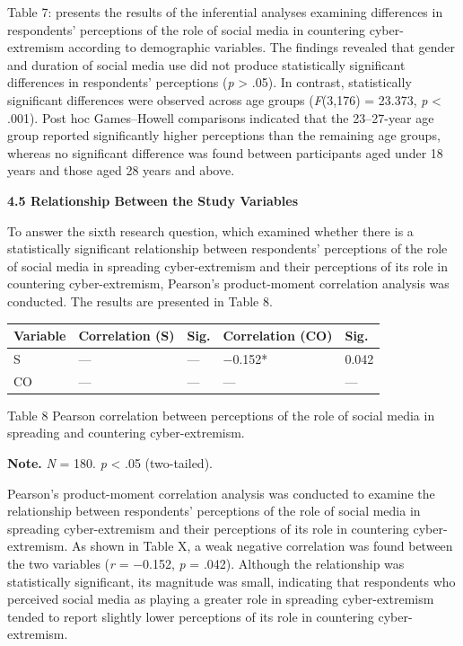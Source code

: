 \documentclass[11pt,a4paper]{article}
\begin{document}
	Table 7: presents the results of the inferential analyses examining differences in respondents' perceptions of the role of social media in countering cyber-extremism according to demographic variables. The findings revealed that gender and duration of social media use did not produce statistically significant differences in respondents' perceptions (\textit{p} \textgreater{} .05). In contrast, statistically significant differences were observed across age groups (\textit{F}(3,176) = 23.373, \textit{p} \textless{} .001). Post hoc Games--Howell comparisons indicated that the 23--27-year age group reported significantly higher perceptions than the remaining age groups, whereas no significant difference was found between participants aged under 18 years and those aged 28 years and above.
	
	\textbf{4.5 Relationship Between the Study Variables}
	
	To answer the sixth research question, which examined whether there is a statistically significant relationship between respondents' perceptions of the role of social media in spreading cyber-extremism and their perceptions of its role in countering cyber-extremism, Pearson's product-moment correlation analysis was conducted. The results are presented in Table 8.
	
	\begin{table}[h]
		\centering
		\begin{tabular}{|l|l|l|l|l|}
			\hline
			Variable & Correlation (S) & Sig. & Correlation (CO) & Sig. \\ \hline
			S & --- & --- & −0.152* & 0.042 \\ \hline
			CO & --- & --- & --- & --- \\ \hline
		\end{tabular}
	\end{table}
	
	Table 8 Pearson correlation between perceptions of the role of social media in spreading and countering cyber-extremism.
	
	\textbf{Note.} \textit{N} = 180. \textit{p} \textless{} .05 (two-tailed).
	
	Pearson's product-moment correlation analysis was conducted to examine the relationship between respondents' perceptions of the role of social media in spreading cyber-extremism and their perceptions of its role in countering cyber-extremism. As shown in Table X, a weak negative correlation was found between the two variables (\textit{r} = −0.152, \textit{p} = .042). Although the relationship was statistically significant, its magnitude was small, indicating that respondents who perceived social media as playing a greater role in spreading cyber-extremism tended to report slightly lower perceptions of its role in countering cyber-extremism.
	
\end{document}
